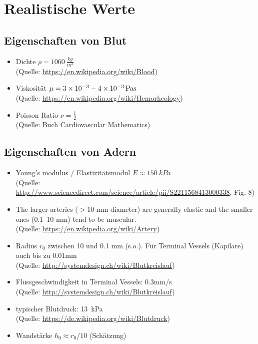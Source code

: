\documentclass[a4paper,12pt]{scrartcl}
\begin{document}
\section*{Realistische Werte}
\subsection*{Eigenschaften von Blut}
\begin{itemize}
  \item Dichte $\rho = \SI{1060}{\frac{kg}{m^3}}$\\
  (Quelle: \url{https://en.wikipedia.org/wiki/Blood})

  \item Viskosität $\mu = \SI{3E-3}{} - \SI{4e-3}{Pa s}$\\
  (Quelle: \url{https://en.wikipedia.org/wiki/Hemorheology})

  \item Poisson Ratio $\nu = \frac{1}{2}$\\
  (Quelle: Buch Cardiovascular Mathematics)

\end{itemize}
\subsection*{Eigenschaften von Adern}
\begin{itemize}
  \item Young's modulus / Elastizitätsmodul $E \approx \SI{150}{kPa}$\\
  (Quelle: \url{http://www.sciencedirect.com/science/article/pii/S2211568413000338}, Fig. 8)
  \item
  The larger arteries ($>$10 mm diameter) are generally elastic and the smaller ones (0.1–10 mm) tend to be muscular.\\
  (Quelle: \url{https://en.wikipedia.org/wiki/Artery})
  \item Radius $r_0$ zwischen 10 und 0.1 mm (s.o.). Für Terminal Vessels (Kapilare) auch bis zu 0.01mm\\
  (Quelle: \url{http://systemdesign.ch/wiki/Blutkreislauf})
  \item Flussgeschwindigkeit in Terminal Vessels: 0.3mm/s\\
  (Quelle: \url{http://systemdesign.ch/wiki/Blutkreislauf})
  \item typischer Blutdruck: \SI{13}{kPa}\\
  (Quelle: \url{https://de.wikipedia.org/wiki/Blutdruck})
  \item Wandstärke $h_0 \approx r_0 / 10$ (Schätzung)
\end{itemize}
\end{document}
